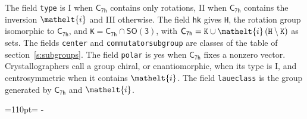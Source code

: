 \documentclass[10pt,a4paper]{article}
\makeatletter
\def\grouprule#1#2{\noalign{\marks\LTgroupmarks{\the\belowrulesep}\nobreak\vskip#1%
  \vskip\aboverulesep}\multispan\LT@cols\unskip{\leaders\hrule\@height#2\hfill\kern\z@}\cr
  \noalign{\penalty\LTrulebreak\vskip\belowrulesep\global\@lastruleclass\z@}}
\newcommand{\needspace}[1]{\par\penalty-100\begingroup\dimen0=#1\relax\dimen2=\pagegoal
  \advance\dimen2-\pagetotal\ifdim\dimen0>\dimen2\relax\ifdim\dimen2>0pt\vfil\break\fi\fi
  \endgroup}
\numberwithin{equation}{section}
\newcommand{\eltfont}[1]{{\let\sigma\eltsigma\mathelt{#1}}}
\newcommand{\grp}[1]{\mathsf{#1}}
\newcommand{\elt}[1]{\eltfont{#1}}
\newcommand{\hmname}[1]{#1}
\newcommand{\orbname}[1]{#1}
\newcommand{\conwayname}[1]{#1}
\newcommand{\igname}[1]{#1}
\newcommand{\olivename}[1]{#1}
\makeatother
\begin{document}
{}
\leavevmode\label{n:element.inversion}The field \texttt{type} is I when $\grp{C_{7h}}$ contains only rotations, II when $\grp{C_{7h}}$ contains the inversion $\elt{i}$ and III otherwise. The field \texttt{hk} gives \texttt{H}, the rotation group isomorphic to $\grp{C_{7h}}$, and \texttt{K}${} = \grp{C_{7h}} \cap \grp{SO(3)}$, with $\grp{C_{7h}} = \texttt{K} \cup \elt{i}\,(\texttt{H} \setminus \texttt{K})$ as sets. The fields \texttt{center} and \texttt{commutatorsubgroup} are classes of the table of section~\ref{s:subgroups}. The field \texttt{polar} is yes when $\grp{C_{7h}}$ fixes a nonzero vector. Crystallographers call a group chiral, or enantiomorphic, when its type is I, and centrosymmetric when it contains $\elt{i}$. The field \texttt{laueclass} is the group generated by $\grp{C_{7h}}$ and $\elt{i}$.
\needspace{110pt}
\end{document}
